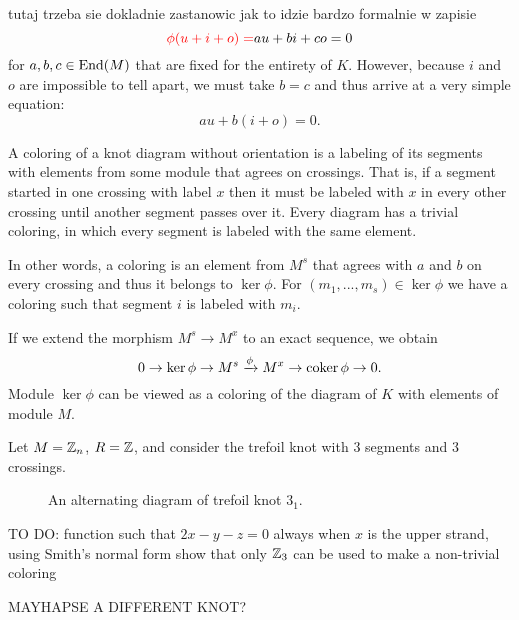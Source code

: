 {\color{yellow}tutaj trzeba sie dokladnie zastanowic jak to idzie bardzo formalnie w zapisie
$${\color{red}\phi(u+i+o)=}au+bi+co=0$$
for $a, b, c\in \operatorname{End}(M)$ that are fixed for the entirety of $K$. However, because $i$ and $o$ are impossible to tell apart, we must take $b=c$ and thus arrive at a very simple equation:
$$au+b(i+o)=0.$$
}

A coloring of a knot diagram without orientation is a labeling of its segments with elements from some module that agrees on crossings. That is, if a segment started in one crossing with label $x$ then it must be labeled with $x$ in every other crossing until another segment passes over it. Every diagram has a trivial coloring, in which every segment is labeled with the same element.

In other words, a coloring is an element from $M^s$ that agrees with $a$ and $b$ on every crossing and thus it belongs to $\ker\phi$. For $(m_1,...,m_s)\in\ker\phi$ we have a coloring such that segment $i$ is labeled with $m_i$.

{\color{yellow}If we extend the morphism $M^s\to M^x$ to an exact sequence, we obtain
$$0\to \ker\phi\to M^s\xrightarrow{\phi}M^x\to \operatorname{coker}\phi\to 0.$$
Module $\ker\phi$ can be viewed as a coloring of the diagram of $K$ with elements of module $M$.}

\begin{example}
  Let $M=\operatorname{\mathbb{Z}}_n$, $R=\operatorname{\mathbb{Z}}$, and consider the trefoil knot with $3$ segments and $3$ crossings.

  \begin{figure}[h] \centering

  \caption{An alternating diagram of trefoil knot $3_1$.}
\end{figure}

{\color{orange}TO DO: function such that $2x-y-z=0$ always when $x$ is the upper strand, using Smith's normal form show that only $\operatorname{\mathbb{Z}}_3$ can be used to make a non-trivial coloring}

{\color{blue}MAYHAPSE A DIFFERENT KNOT?}

\end{example}


